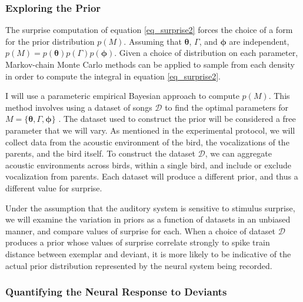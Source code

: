 \subsubsection{Exploring the Prior}
\label{sec:prior}

The surprise computation of equation \eqref{eq_surprise2} forces the choice of a form for the prior
distribution $p(M)$. Assuming that $\bm{\theta}$, $\Gamma$, and $\bm{\phi}$ are independent,
$p(M) = p(\bm{\theta}) p(\Gamma) p(\bm{\phi})$. Given a choice of distribution on each parameter,
Markov-chain Monte Carlo methods \cite{Brooks2011} can be applied to sample from each density in order to compute
the integral in equation \eqref{eq_surprise2}.

I will use a parameteric empirical Bayesian approach \cite{Carlin2009} to compute $p(M)$. This method
involves using a dataset of songs $\mathcal{D}$ to find the optimal parameters for
$M=\{\bm{\theta}, \Gamma, \bm{\phi} \}$ \cite{Carlin2009}. The dataset used to construct the prior
will be considered a free parameter that we will vary. As mentioned in the experimental protocol, we will
collect data from the acoustic environment of the bird, the vocalizations of the parents, and the
bird itself. To construct the dataset $\mathcal{D}$, we can aggregate acoustic environments across
birds, within a single bird, and include or exclude vocalization from parents. Each dataset will
produce a different prior, and thus a different value for surprise.

Under the assumption that the auditory system is sensitive to stimulus surprise, we will examine the
variation in priors as a function of datasets in an unbiased manner, and compare values of surprise
for each. When a choice of dataset $\mathcal{D}$ produces a prior whose values of surprise correlate
strongly to spike train distance between exemplar and deviant, it is more likely to be indicative of
the actual prior distribution represented by the neural system being recorded.

\subsubsection{Quantifying the Neural Response to Deviants}
\label{sec:deviant_neural_response}
